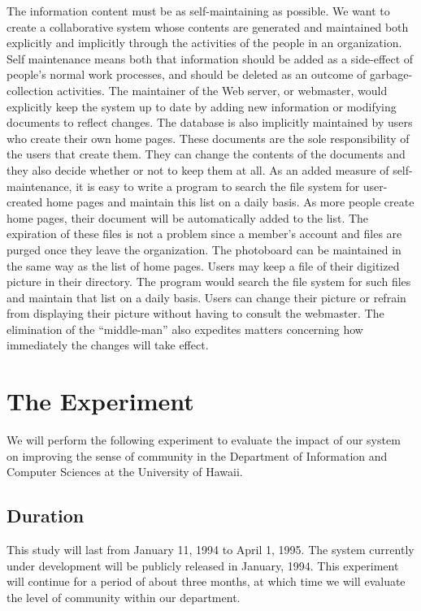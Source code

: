 The information content must be as self-maintaining as possible. We want to
create a collaborative system whose contents are generated and maintained
both explicitly and implicitly through the activities of the people in an
organization.  Self maintenance means both that information should be added
as a side-effect of people's normal work processes, and should be deleted
as an outcome of garbage-collection activities.  The maintainer of the Web
server, or webmaster, would explicitly keep the system up to date by adding
new information or modifying documents to reflect changes.  The database is
also implicitly maintained by users who create their own home pages.  These
documents are the sole responsibility of the users that create them.  They
can change the contents of the documents and they also decide whether or
not to keep them at all.  As an added measure of self-maintenance, it is
easy to write a program to search the file system for user-created home
pages and maintain this list on a daily basis.  As more people create home
pages, their document will be automatically added to the list.  The
expiration of these files is not a problem since a member's account and
files are purged once they leave the organization.  The photoboard can be
maintained in the same way as the list of home pages.  Users may keep a
file of their digitized picture in their directory.  The program would
search the file system for such files and maintain that list on a daily
basis.  Users can change their picture or refrain from displaying their
picture without having to consult the webmaster.  The elimination of the
``middle-man'' also expedites matters concerning how immediately the changes
will take effect.


\section {The Experiment}
We will perform the following experiment to evaluate the impact of our
system on improving the sense of community in the Department of Information
and Computer Sciences at the University of Hawaii.

\subsection{Duration}
This study will last from January 11, 1994 to April 1, 1995.  The system
currently under development will be publicly released in January, 1994.
This experiment will continue for a period of about three months, at which
time we will evaluate the level of community within our department.

